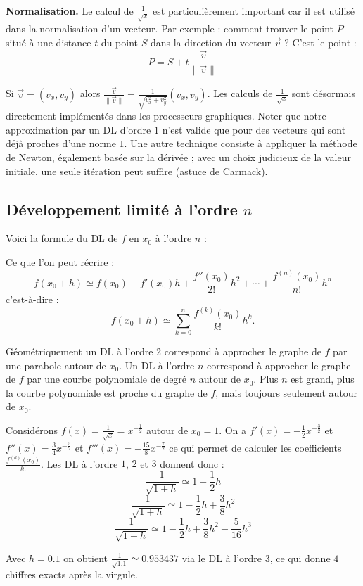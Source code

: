 \documentclass[11pt,class=report,crop=false]{standalone}
\begin{document}
\textbf{Normalisation.} Le calcul de $\frac{1}{\sqrt{x}}$ est particulièrement important car il est utilisé dans la normalisation d'un vecteur.
Par exemple : comment trouver le point $P$ situé à une distance $t$ du point $S$ dans la direction du vecteur $\vec{v}$ ?
C'est le point :
$$P = S + t \frac{\vec{v}}{\|\vec{v}\|}$$


Si $\vec{v} = (v_x, v_y)$ alors $\frac{\vec{v}}{\|\vec{v}\|} = \frac{1}{\sqrt{v_x^2 + v_y^2}} (v_x, v_y)$.
Les calculs de $\frac{1}{\sqrt{x}}$ sont désormais directement implémentés dans les processeurs graphiques.
Noter que notre approximation par un DL d'ordre $1$ n'est valide que pour des vecteurs qui sont déjà proches d'une norme $1$.
Une autre technique consiste à appliquer la méthode de Newton, également basée sur la dérivée ; avec un choix judicieux de la valeur initiale, une seule itération peut suffire (\og{}astuce de Carmack\fg{}).



\subsection{Développement limité à l'ordre $n$}

Voici la formule du DL de $f$ en $x_0$ à l'ordre $n$ :

Ce que l'on peut récrire :
$$f(x_0+h) \simeq f(x_0)+f'(x_0)h+\frac{f''(x_0)}{2!}h^2+\cdots
+\frac{f^{(n)}(x_0)}{n!}h^n$$
c'est-à-dire :
$$f(x_0+h) \simeq \sum_{k=0}^n \frac{f^{(k)}(x_0)}{k!}h^k.$$

Géométriquement un DL à l'ordre $2$ correspond à approcher le graphe de $f$ par une parabole autour de $x_0$.
Un DL à l'ordre $n$ correspond à approcher le graphe de $f$ par une courbe polynomiale de degré $n$ autour de $x_0$.
Plus $n$ est grand, plus la courbe polynomiale est proche du graphe de $f$, mais toujours seulement autour de $x_0$.



\begin{exemple}
Considérons $f(x) = \frac{1}{\sqrt{x}}= x^{-\frac12}$ autour de $x_0 = 1$.
On a $f'(x) = -\frac{1}{2}x^{-\frac32}$ et $f''(x) = \frac34 x^{-\frac52}$ et $f'''(x) = -\frac{15}{8}{x^{-\frac72}}$
ce qui permet de calculer les coefficients $\frac{f^{(k)}(x_0)}{k!}$.
Les DL à l'ordre $1$, $2$ et $3$ donnent donc :
$$\frac{1}{\sqrt{1+h}} \simeq 1 - \frac{1}{2}h$$
$$\frac{1}{\sqrt{1+h}} \simeq 1 - \frac{1}{2}h + \frac{3}{8}h^2$$
$$\frac{1}{\sqrt{1+h}} \simeq 1 - \frac{1}{2}h + \frac{3}{8}h^2 - \frac{5}{16}h^3$$

Avec $h=0.1$ on obtient $\frac{1}{\sqrt{1.1}} \simeq 0.953437$ via le DL à l'ordre $3$, ce qui donne $4$ chiffres exacts après la virgule.
\end{exemple}
\end{document}
